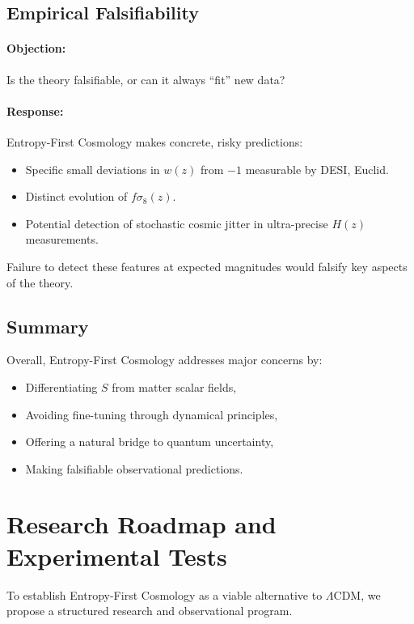 \documentclass{article}
\begin{document}
\subsection{Empirical Falsifiability}

\paragraph{Objection:}  
Is the theory falsifiable, or can it always ``fit'' new data?

\paragraph{Response:}
Entropy-First Cosmology makes concrete, risky predictions:
\begin{itemize}
    \item Specific small deviations in $w(z)$ from $-1$ measurable by DESI, Euclid.
    \item Distinct evolution of $f\sigma_8(z)$.
    \item Potential detection of stochastic cosmic jitter in ultra-precise $H(z)$ measurements.
\end{itemize}

Failure to detect these features at expected magnitudes would falsify key aspects of the theory.



\subsection{Summary}

Overall, Entropy-First Cosmology addresses major concerns by:
\begin{itemize}
    \item Differentiating $S$ from matter scalar fields,
    \item Avoiding fine-tuning through dynamical principles,
    \item Offering a natural bridge to quantum uncertainty,
    \item Making falsifiable observational predictions.
\end{itemize}

\section{Research Roadmap and Experimental Tests}

To establish Entropy-First Cosmology as a viable alternative to $\Lambda$CDM, we propose a structured research and observational program.
\end{document}
